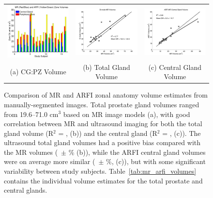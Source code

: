 \begin{figure}[htb!]
\centering
\begin{tabular}{ccc}
\includegraphics[width=0.3\linewidth]{figs/mr_arfi_volumes} &
\includegraphics[width=0.3\linewidth]{figs/mr_arfi_total_linreg} &
\includegraphics[width=0.3\linewidth]{figs/mr_arfi_central_linreg} \\
(a) CG:PZ Volume & (b) Total Gland Volume & (c) Central Gland Volume \\
\end{tabular}
\caption{Comparison of MR and ARFI zonal anatomy volume estimates from
    manually-segmented images.  Total prostate gland volumes ranged from
    19.6--71.0 cm$^3$ based on MR image models (a), with good correlation
    between MR and ultrasound imaging for both the total gland volume (R$^2$ =
    \MRarfiVolTotalRsq, (b)) and the central gland (R$^2$ =
    \MRarfiVolCentralRsq, (c)).  The ultrasound total gland volumes had a positive
    bias compared with the MR volumes (\MRarfiVolTotalMeanDiff~$\pm$
    \MRarfiVolTotalStdDiff\% (b)), while the ARFI central gland volumes were on
    average more similar (\MRarfiVolCentralMeanDiff~$\pm$
    \MRarfiVolCentralStdDiff\%, (c)), but with some significant variability
    between study subjects.  Table~\ref{tab:mr_arfi_volumes} contains the
    individual volume estimates for the total prostate and central glands.}
\label{fig:mr_arfi_volumes} 
\end{figure}
